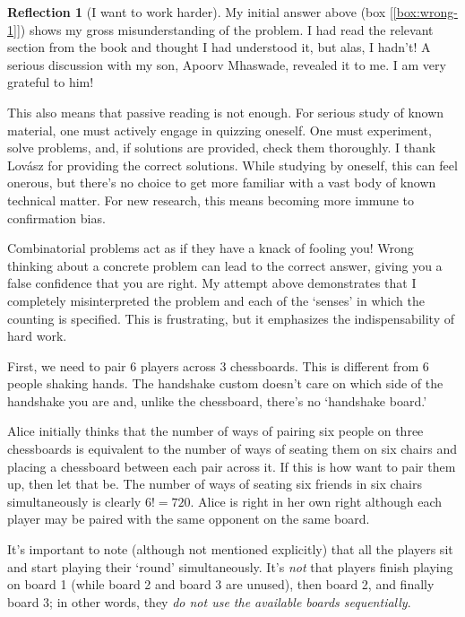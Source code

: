 \documentclass[11pt]{book}
\theoremstyle{definition}
\theoremstyle{plain}
\theoremstyle{definition}
\theoremstyle{problemstyle}
\theoremstyle{remark}
\theoremstyle{definition}
\newtheorem{reflection}{Reflection}
\begin{document}
\begin{reflection}[I want to work harder]
    \label{ref:work-harder}
    My initial answer above (box [\ref{box:wrong-1}]) shows my gross misunderstanding of the problem. I had read the relevant section from the book and thought I had understood it, but alas, I hadn't! A serious discussion with my son, Apoorv Mhaswade, revealed it to me. I am very grateful to him! 

    This also means that passive reading is not enough. For serious study of known material, one must actively engage in quizzing oneself. One must experiment, solve problems, and, if solutions are provided, check them thoroughly. I thank Lov\'asz for providing the correct solutions. While studying by oneself, this can feel onerous, but there's no choice to get more familiar with a vast body of known technical matter. For new research, this means becoming more immune to confirmation bias.

    Combinatorial problems act as if they have a knack of fooling you! Wrong thinking about a concrete problem can lead to the correct answer, giving you a false confidence that you are right. My attempt above demonstrates that I completely misinterpreted the problem and each of the `senses' in which the counting is specified. This is frustrating, but it emphasizes the indispensability of hard work.


    First, we need to pair 6 players across 3 chessboards. This is different from 6 people shaking hands. The handshake custom doesn't care on which side of the handshake you are and, unlike the chessboard, there's no `handshake board.' 

    Alice initially thinks that the number of ways of pairing six people on three chessboards is equivalent to the number of ways of seating them on six chairs and placing a chessboard between each pair across it. If this is how want to pair them up, then let that be. The number of ways of seating six friends in six chairs simultaneously is clearly $6!=720$. Alice is right in her own right although each player may be paired with the same opponent on the same board.

    It's important to note (although not mentioned explicitly) that all the players sit and start playing their `round' simultaneously. It's \emph{not} that players finish playing on board 1 (while board 2 and board 3 are unused), then board 2, and finally board 3; in other words, they \emph{do not use the available boards sequentially}. 


\end{reflection}
\end{document}
